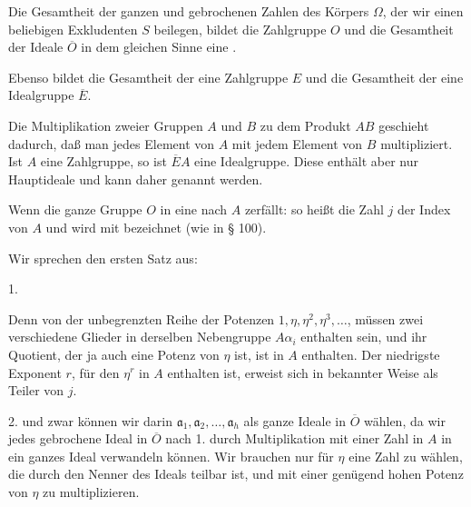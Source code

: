 
Die Gesamtheit der ganzen und gebrochenen Zahlen des Körpers $\Omega$, der wir
einen beliebigen Exkludenten $S$ beilegen, bildet die Zahlgruppe $O$ und die
Gesamtheit der Ideale $\overline{O}$ in dem gleichen Sinne eine .

Ebenso bildet die Gesamtheit der  eine Zahlgruppe $E$
und die Gesamtheit der  eine Idealgruppe $\overline{E}$.

Die Multiplikation zweier Gruppen $A$ und $B$ zu dem Produkt $AB$ geschieht
dadurch, daß man jedes Element von $A$ mit jedem Element von $B$
multipliziert. Ist $A$ eine Zahlgruppe, so ist $\overline{E}A$ eine
Idealgruppe. Diese enthält aber nur Hauptideale und kann daher
 genannt werden.

Wenn die ganze Gruppe $O$ in eine  nach $A$
zerfällt:
so heißt die Zahl $j$ der Index von $A$ und wird mit
bezeichnet (wie in § 100).

Wir sprechen den ersten Satz aus:

1. 

Denn von der unbegrenzten Reihe der Potenzen $1, \eta, \eta^2, \eta^3, \dots$,
müssen zwei verschiedene Glieder in derselben Nebengruppe $A\alpha_i$
enthalten sein, und ihr Quotient, der ja auch eine Potenz von $\eta$ ist, ist
in $A$ enthalten. Der niedrigste Exponent $r$, für den $\eta^r$ in $A$
enthalten ist, erweist sich in bekannter Weise als Teiler von $j$.

2. 
und zwar können wir darin $\mathfrak{a}_1, \mathfrak{a}_2, \dots,
\mathfrak{a}_h$ als ganze Ideale in $\overline{O}$ wählen, da wir jedes
gebrochene Ideal in $\overline{O}$ nach 1. durch Multiplikation mit einer
Zahl in $A$ in ein ganzes Ideal verwandeln können. Wir brauchen nur für
$\eta$ eine Zahl zu wählen, die durch den Nenner des Ideals teilbar ist, und
mit einer genügend hohen Potenz von $\eta$ zu multiplizieren.
